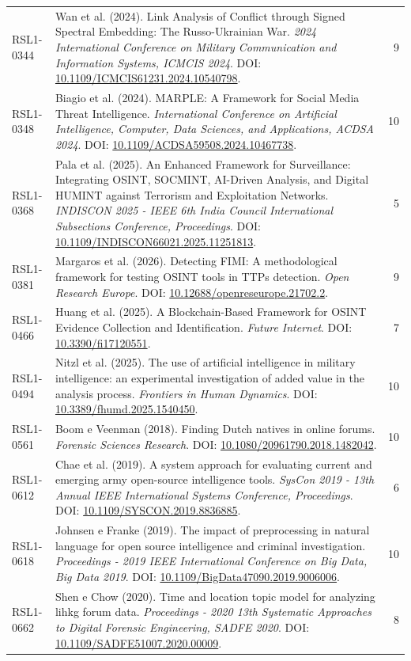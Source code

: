 \begin{small}
\begin{longtable}{lp{11.2cm}r}
RSL1-0344 & Wan et al. (2024). Link Analysis of Conflict through Signed Spectral Embedding: The Russo-Ukrainian War. \textit{2024 International Conference on Military Communication and Information Systems, ICMCIS 2024}. DOI: \url{10.1109/ICMCIS61231.2024.10540798}. & 9 \\
RSL1-0348 & Biagio et al. (2024). MARPLE: A Framework for Social Media Threat Intelligence. \textit{International Conference on Artificial Intelligence, Computer, Data Sciences, and Applications, ACDSA 2024}. DOI: \url{10.1109/ACDSA59508.2024.10467738}. & 10 \\
RSL1-0368 & Pala et al. (2025). An Enhanced Framework for Surveillance: Integrating OSINT, SOCMINT, AI-Driven Analysis, and Digital HUMINT against Terrorism and Exploitation Networks. \textit{INDISCON 2025 - IEEE 6th India Council International Subsections Conference, Proceedings}. DOI: \url{10.1109/INDISCON66021.2025.11251813}. & 5 \\
RSL1-0381 & Margaros et al. (2026). Detecting FIMI: A methodological framework for testing OSINT tools in TTPs detection. \textit{Open Research Europe}. DOI: \url{10.12688/openreseurope.21702.2}. & 9 \\
RSL1-0466 & Huang et al. (2025). A Blockchain-Based Framework for OSINT Evidence Collection and Identification. \textit{Future Internet}. DOI: \url{10.3390/fi17120551}. & 7 \\
RSL1-0494 & Nitzl et al. (2025). The use of artificial intelligence in military intelligence: an experimental investigation of added value in the analysis process. \textit{Frontiers in Human Dynamics}. DOI: \url{10.3389/fhumd.2025.1540450}. & 10 \\
RSL1-0561 & Boom e Veenman (2018). Finding Dutch natives in online forums. \textit{Forensic Sciences Research}. DOI: \url{10.1080/20961790.2018.1482042}. & 10 \\
RSL1-0612 & Chae et al. (2019). A system approach for evaluating current and emerging army open-source intelligence tools. \textit{SysCon 2019 - 13th Annual IEEE International Systems Conference, Proceedings}. DOI: \url{10.1109/SYSCON.2019.8836885}. & 6 \\
RSL1-0618 & Johnsen e Franke (2019). The impact of preprocessing in natural language for open source intelligence and criminal investigation. \textit{Proceedings - 2019 IEEE International Conference on Big Data, Big Data 2019}. DOI: \url{10.1109/BigData47090.2019.9006006}. & 10 \\
RSL1-0662 & Shen e Chow (2020). Time and location topic model for analyzing lihkg forum data. \textit{Proceedings - 2020 13th Systematic Approaches to Digital Forensic Engineering, SADFE 2020}. DOI: \url{10.1109/SADFE51007.2020.00009}. & 8 \\

\end{longtable}
\end{small}

